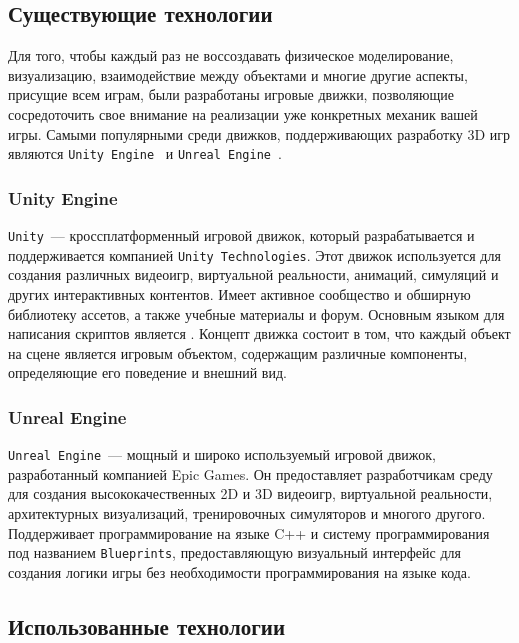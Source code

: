 \subsection{Существующие технологии}

Для того, чтобы каждый раз не воссоздавать физическое моделирование, визуализацию, взаимодействие между объектами и многие другие аспекты, присущие всем играм, были разработаны игровые движки, позволяющие сосредоточить свое внимание на реализации уже конкретных механик вашей игры. Самыми популярными среди движков, поддерживающих разработку 3D игр являются \texttt{Unity Engine}~\cite{enwiki:1186824491} и \texttt{Unreal Engine}~\cite{unrealengine}.

\subsubsection{Unity Engine}

\texttt{Unity}~--- кроссплатформенный игровой движок, который разрабатывается и поддерживается компанией \texttt{Unity Technologies}. Этот движок используется для создания различных видеоигр, виртуальной реальности, анимаций, симуляций и других интерактивных контентов. Имеет активное сообщество и обширную библиотеку ассетов, а также учебные материалы и форум. Основным языком для написания скриптов является \csharp. Концепт движка состоит в том, что каждый объект на сцене является игровым объектом, содержащим различные компоненты, определяющие его поведение и внешний вид.

\subsubsection{Unreal Engine}

\texttt{Unreal Engine}~--- мощный и широко используемый игровой движок, разработанный компанией Epic Games. Он предоставляет разработчикам среду для создания высококачественных 2D и 3D видеоигр, виртуальной реальности, архитектурных визуализаций, тренировочных симуляторов и многого другого. Поддерживает программирование на языке C++ и систему программирования под названием \texttt{Blueprints}, предоставляющую визуальный интерфейс для создания логики игры без необходимости программирования на языке кода.

\subsection{Использованные технологии}

